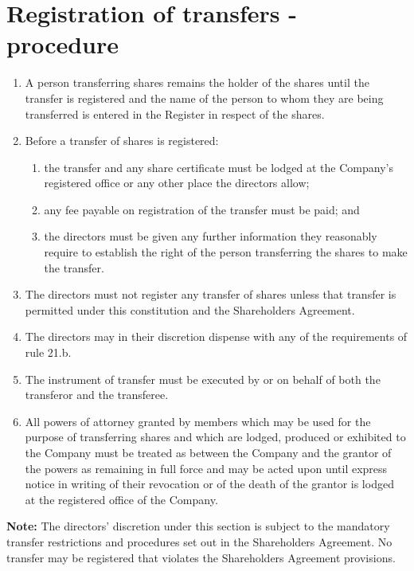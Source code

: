 \section{Registration of transfers - procedure}

\begin{enumerate}[label=(\alph*)]
    \item A person transferring shares remains the holder of the shares until the transfer is registered and the name of the person to whom they are being transferred is entered in the Register in respect of the shares.
    
    \item Before a transfer of shares is registered:
    \begin{enumerate}[label=(\roman*)]
        \item the transfer and any share certificate must be lodged at the Company's registered office or any other place the directors allow;
        \item any fee payable on registration of the transfer must be paid; and
        \item the directors must be given any further information they reasonably require to establish the right of the person transferring the shares to make the transfer.
    \end{enumerate}
    
    \item The directors must not register any transfer of shares unless that transfer is permitted under this constitution and the Shareholders Agreement.
    
    \item The directors may in their discretion dispense with any of the requirements of rule 21.b.
    
    \item The instrument of transfer must be executed by or on behalf of both the transferor and the transferee.
    
    \item All powers of attorney granted by members which may be used for the purpose of transferring shares and which are lodged, produced or exhibited to the Company must be treated as between the Company and the grantor of the powers as remaining in full force and may be acted upon until express notice in writing of their revocation or of the death of the grantor is lodged at the registered office of the Company.
\end{enumerate}

\textbf{Note:} The directors' discretion under this section is subject to the mandatory transfer restrictions and procedures set out in the Shareholders Agreement. No transfer may be registered that violates the Shareholders Agreement provisions. 